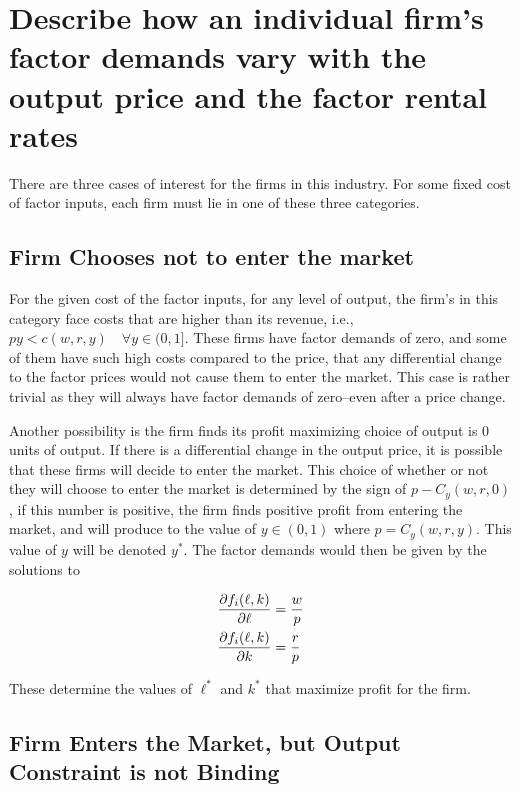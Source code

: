 \documentclass[12pt]{paper}
\begin{document}
\section*{Describe how an individual firm's factor demands vary with
  the output price and the factor rental rates}

There are three cases of interest for the firms in this industry. For
some fixed cost of factor inputs, each firm must lie in one of these three
categories.

\subsection*{Firm Chooses not to enter the market}

For the given cost of the factor inputs, for any level of output, the
firm's in this category face costs that are higher than its revenue, i.e.,
$py < c( w, r, y) \quad \forall y \in (0,1]$. These firms have factor demands of
zero, and some of them have such high costs compared to the price, that any
differential change to the factor prices would not cause them
to enter the market. This case is rather trivial as they will
always have factor demands of zero--even after a price change.

Another possibility is the firm finds its profit maximizing choice of
output is $0$ units of output. If there is a differential change in
the output price, it is possible that these firms will decide to
enter the market. This choice of whether or not they will choose to
enter the market is determined by the sign of $p - C_y(w,r,0)$, if
this number is positive, the firm finds positive profit from entering
the market, and will produce to the value of $y \in (0,1)$ where $p =
C_y(w,r,y)$. This value of $y$ will be
denoted $y^{*}$. The factor demands would then be given by the
solutions to

\begin{align*}
  \frac{ \partial f_i(\ell,k)}{ \partial \ell} &= \frac{w}{p}\\
  \frac{ \partial f_i(\ell,k)}{ \partial k} &= \frac{r}{p}
\end{align*}

These determine the values of $\ell^{*}$ and $k^{*}$ that maximize profit
for the firm.

\subsection*{Firm Enters the Market, but Output Constraint is not
  Binding}
\end{document}
